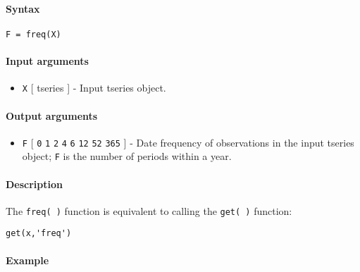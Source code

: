 


	\paragraph{Syntax}

\begin{verbatim}
F = freq(X)
\end{verbatim}

\paragraph{Input arguments}

\begin{itemize}
\itemsep1pt\parskip0pt
\item
  \texttt{X} {[} tseries {]} - Input tseries object.
\end{itemize}

\paragraph{Output arguments}

\begin{itemize}
\itemsep1pt\parskip0pt
\item
  \texttt{F} {[} \texttt{0} \textbar{} \texttt{1} \textbar{} \texttt{2}
  \textbar{} \texttt{4} \textbar{} \texttt{6} \textbar{} \texttt{12}
  \textbar{} \texttt{52} \textbar{} \texttt{365} {]} - Date frequency of
  observations in the input tseries object; \texttt{F} is the number of
  periods within a year.
\end{itemize}

\paragraph{Description}

The \texttt{freq( )} function is equivalent to calling the
\texttt{get( )} function:

\begin{verbatim}
get(x,'freq')
\end{verbatim}

\paragraph{Example}


